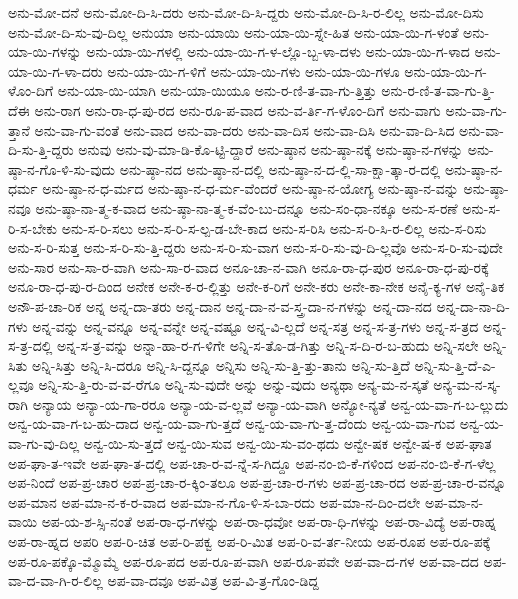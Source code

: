 {ಅನು-ಮೋ-ದನೆ
ಅನು-ಮೋ-ದಿ-ಸಿ-ದರು
ಅನು-ಮೋ-ದಿ-ಸಿ-ದ್ದರು
ಅನು-ಮೋ-ದಿ-ಸಿ-ರ-ಲಿಲ್ಲ
ಅನು-ಮೋ-ದಿಸು
ಅನು-ಮೋ-ದಿ-ಸು-ವು-ದಿಲ್ಲ
ಅನುಯಾ
ಅನು-ಯಾಯಿ
ಅನು-ಯಾ-ಯಿ-ಸ್ನೇ-ಹಿತ
ಅನು-ಯಾ-ಯಿ-ಗ-ಳಂತೆ
ಅನು-ಯಾ-ಯಿ-ಗಳನ್ನು
ಅನು-ಯಾ-ಯಿ-ಗಳಲ್ಲಿ
ಅನು-ಯಾ-ಯಿ-ಗ-ಳ-ಲ್ಲೊ-ಬ್ಬ-ಳಾ-ದಳು
ಅನು-ಯಾ-ಯಿ-ಗ-ಳಾದ
ಅನು-ಯಾ-ಯಿ-ಗ-ಳಾ-ದರು
ಅನು-ಯಾ-ಯಿ-ಗ-ಳಿಗೆ
ಅನು-ಯಾ-ಯಿ-ಗಳು
ಅನು-ಯಾ-ಯಿ-ಗಳೂ
ಅನು-ಯಾ-ಯಿ-ಗ-ಳೊಂ-ದಿಗೆ
ಅನು-ಯಾ-ಯಿ-ಯಾಗಿ
ಅನು-ಯಾ-ಯಿಯೂ
ಅನು-ರ-ಣಿ-ತ-ವಾ-ಗು-ತ್ತಿತ್ತು
ಅನು-ರ-ಣಿ-ತ-ವಾ-ಗು-ತ್ತಿ-ದೆಈ
ಅನು-ರಾಗ
ಅನು-ರಾ-ಧ-ಪು-ರದ
ಅನು-ರೂ-ಪ-ವಾದ
ಅನು-ವ-ರ್ತಿ-ಗ-ಳೊಂ-ದಿಗೆ
ಅನು-ವಾಗು
ಅನು-ವಾ-ಗು-ತ್ತಾನೆ
ಅನು-ವಾ-ಗು-ವಂತೆ
ಅನು-ವಾದ
ಅನು-ವಾ-ದರು
ಅನು-ವಾ-ದಿಸ
ಅನು-ವಾ-ದಿಸಿ
ಅನು-ವಾ-ದಿ-ಸಿದ
ಅನು-ವಾ-ದಿ-ಸು-ತ್ತಿ-ದ್ದರು
ಅನುವು
ಅನು-ವು-ಮಾ-ಡಿ-ಕೊ-ಟ್ಟಿ-ದ್ದಾರೆ
ಅನು-ಷ್ಠಾನ
ಅನು-ಷ್ಠಾ-ನಕ್ಕೆ
ಅನು-ಷ್ಠಾ-ನ-ಗಳನ್ನು
ಅನು-ಷ್ಠಾ-ನ-ಗೊ-ಳಿ-ಸು-ವುದು
ಅನು-ಷ್ಠಾ-ನದ
ಅನು-ಷ್ಠಾ-ನ-ದಲ್ಲಿ
ಅನು-ಷ್ಠಾ-ನ-ದ-ಲ್ಲಿ-ಸಾ-ಕ್ಷಾ-ತ್ಕಾ-ರ-ದಲ್ಲಿ
ಅನು-ಷ್ಠಾ-ನ-ಧರ್ಮ
ಅನು-ಷ್ಠಾ-ನ-ಧ-ರ್ಮದ
ಅನು-ಷ್ಠಾ-ನ-ಧ-ರ್ಮ-ವೆಂದರೆ
ಅನು-ಷ್ಠಾ-ನ-ಯೋಗ್ಯ
ಅನು-ಷ್ಠಾ-ನ-ವನ್ನು
ಅನು-ಷ್ಠಾ-ನವೂ
ಅನು-ಷ್ಠಾ-ನಾ-ತ್ಮ-ಕ-ವಾದ
ಅನು-ಷ್ಠಾ-ನಾ-ತ್ಮ-ಕ-ವೆಂ-ಬು-ದನ್ನೂ
ಅನು-ಸಂ-ಧಾ-ನಕ್ಕೂ
ಅನು-ಸ-ರಣೆ
ಅನು-ಸ-ರಿ-ಸ-ಬೇಕು
ಅನು-ಸ-ರಿ-ಸಲು
ಅನು-ಸ-ರಿ-ಸ-ಲ್ಪ-ಡ-ಬೇ-ಕಾದ
ಅನು-ಸ-ರಿಸಿ
ಅನು-ಸ-ರಿ-ಸಿ-ರ-ಲಿಲ್ಲ
ಅನು-ಸ-ರಿಸು
ಅನು-ಸ-ರಿ-ಸುತ್ತ
ಅನು-ಸ-ರಿ-ಸು-ತ್ತಿ-ದ್ದರು
ಅನು-ಸ-ರಿ-ಸು-ವಾಗ
ಅನು-ಸ-ರಿ-ಸು-ವು-ದಿ-ಲ್ಲವೊ
ಅನು-ಸ-ರಿ-ಸು-ವುದೇ
ಅನು-ಸಾರ
ಅನು-ಸಾ-ರ-ವಾಗಿ
ಅನು-ಸಾ-ರ-ವಾದ
ಅನೂ-ಚಾ-ನ-ವಾಗಿ
ಅನೂ-ರಾ-ಧ-ಪುರ
ಅನೂ-ರಾ-ಧ-ಪು-ರಕ್ಕೆ
ಅನೂ-ರಾ-ಧ-ಪು-ರ-ದಿಂದ
ಅನೇಕ
ಅನೇ-ಕ-ರ-ಲ್ಲಿತ್ತು
ಅನೇ-ಕ-ರಿಗೆ
ಅನೇ-ಕರು
ಅನೇ-ಕಾ-ನೇಕ
ಅನೈ-ಕ್ಯ-ಗಳ
ಅನೈ-ತಿಕ
ಅನೌ-ಪ-ಚಾ-ರಿಕ
ಅನ್ನ
ಅನ್ನ-ದಾ-ತರು
ಅನ್ನ-ದಾನ
ಅನ್ನ-ದಾ-ನ-ವ-ಸ್ತ್ರ-ದಾ-ನ-ಗಳನ್ನು
ಅನ್ನ-ದಾ-ನದ
ಅನ್ನ-ದಾ-ನಾ-ದಿ-ಗಳು
ಅನ್ನ-ವನ್ನು
ಅನ್ನ-ವನ್ನೂ
ಅನ್ನ-ವನ್ನೇ
ಅನ್ನ-ವಷ್ಟೂ
ಅನ್ನ-ವಿ-ಲ್ಲದೆ
ಅನ್ನ-ಸತ್ರ
ಅನ್ನ-ಸ-ತ್ರ-ಗಳು
ಅನ್ನ-ಸ-ತ್ರದ
ಅನ್ನ-ಸ-ತ್ರ-ದಲ್ಲಿ
ಅನ್ನ-ಸ-ತ್ರ-ವನ್ನು
ಅನ್ನಾ-ಹಾ-ರ-ಗ-ಳಿಗೇ
ಅನ್ನಿ-ಸ-ತೊ-ಡ-ಗಿತ್ತು
ಅನ್ನಿ-ಸ-ದಿ-ರ-ಬ-ಹುದು
ಅನ್ನಿ-ಸಲೇ
ಅನ್ನಿ-ಸಿತು
ಅನ್ನಿ-ಸಿತ್ತು
ಅನ್ನಿ-ಸಿ-ದರೂ
ಅನ್ನಿ-ಸಿ-ದ್ದನ್ನೂ
ಅನ್ನಿಸು
ಅನ್ನಿ-ಸು-ತ್ತಿ-ತ್ತು-ತಾನು
ಅನ್ನಿ-ಸು-ತ್ತಿದೆ
ಅನ್ನಿ-ಸು-ತ್ತಿ-ದೆ-ಎ-ಲ್ಲವೂ
ಅನ್ನಿ-ಸು-ತ್ತಿ-ರು-ವ-ವ-ರೆಗೂ
ಅನ್ನಿ-ಸು-ವುದೇ
ಅನ್ನು
ಅನ್ನು-ವುದು
ಅನ್ಯಥಾ
ಅನ್ಯ-ಮ-ನ-ಸ್ಕತೆ
ಅನ್ಯ-ಮ-ನ-ಸ್ಕ-ರಾಗಿ
ಅನ್ಯಾಯ
ಅನ್ಯಾ-ಯ-ಗಾ-ರರೂ
ಅನ್ಯಾ-ಯ-ವ-ಲ್ಲವೆ
ಅನ್ಯಾ-ಯ-ವಾಗಿ
ಅನ್ಯೋ-ನ್ಯತೆ
ಅನ್ವ-ಯ-ವಾ-ಗ-ಬ-ಲ್ಲುದು
ಅನ್ವ-ಯ-ವಾ-ಗ-ಬ-ಹು-ದಾದ
ಅನ್ವ-ಯ-ವಾ-ಗು-ತ್ತದೆ
ಅನ್ವ-ಯ-ವಾ-ಗು-ತ್ತ-ದೆಂದು
ಅನ್ವ-ಯ-ವಾ-ಗುವ
ಅನ್ವ-ಯ-ವಾ-ಗು-ವು-ದಿಲ್ಲ
ಅನ್ವ-ಯಿ-ಸು-ತ್ತದೆ
ಅನ್ವ-ಯಿ-ಸುವ
ಅನ್ವ-ಯಿ-ಸು-ವಂ-ಥದು
ಅನ್ವೇ-ಷಕ
ಅನ್ವೇ-ಷ-ಕ
ಅಪ-ಘಾತ
ಅಪ-ಘಾ-ತ-ಇವೇ
ಅಪ-ಘಾ-ತ-ದಲ್ಲಿ
ಅಪ-ಚಾ-ರ-ವ-ನ್ನೆ-ಸ-ಗಿದ್ದೂ
ಅಪ-ನಂ-ಬಿ-ಕೆ-ಗಳಿಂದ
ಅಪ-ನಂ-ಬಿ-ಕೆ-ಗ-ಳೆಲ್ಲ
ಅಪ-ನಿಂದೆ
ಅಪ-ಪ್ರ-ಚಾರ
ಅಪ-ಪ್ರ-ಚಾ-ರ-ಕ್ಕಿಂ-ತಲೂ
ಅಪ-ಪ್ರ-ಚಾ-ರ-ಗಳು
ಅಪ-ಪ್ರ-ಚಾ-ರದ
ಅಪ-ಪ್ರ-ಚಾ-ರ-ವನ್ನೂ
ಅಪ-ಮಾನ
ಅಪ-ಮಾ-ನ-ಕ-ರ-ವಾದ
ಅಪ-ಮಾ-ನ-ಗೊ-ಳಿ-ಸ-ಬಾ-ರದು
ಅಪ-ಮಾ-ನ-ದಿಂ-ದಲೇ
ಅಪ-ಮಾ-ನ-ವಾಯಿ
ಅಪ-ಯ-ಶ-ಸ್ಸಿ-ನಂತೆ
ಅಪ-ರಾ-ಧ-ಗಳನ್ನು
ಅಪ-ರಾ-ಧವೋ
ಅಪ-ರಾ-ಧಿ-ಗಳನ್ನು
ಅಪ-ರಾ-ವಿದ್ಯೆ
ಅಪ-ರಾಹ್ನ
ಅಪ-ರಾ-ಹ್ನದ
ಅಪರಿ
ಅಪ-ರಿ-ಚಿತ
ಅಪ-ರಿ-ಪಕ್ವ
ಅಪ-ರಿ-ಮಿತ
ಅಪ-ರಿ-ವ-ರ್ತ-ನೀಯ
ಅಪ-ರೂಪ
ಅಪ-ರೂ-ಪಕ್ಕೆ
ಅಪ-ರೂ-ಪಕ್ಕೊ-ಮ್ಮೊಮ್ಮೆ
ಅಪ-ರೂ-ಪದ
ಅಪ-ರೂ-ಪ-ವಾಗಿ
ಅಪ-ರೂ-ಪವೇ
ಅಪ-ವಾ-ದ-ಗಳ
ಅಪ-ವಾ-ದದ
ಅಪ-ವಾ-ದ-ವಾ-ಗಿ-ರ-ಲಿಲ್ಲ
ಅಪ-ವಾ-ದವೂ
ಅಪ-ವಿತ್ರ
ಅಪ-ವಿ-ತ್ರ-ಗೊಂ-ಡಿದ್ದ
}
